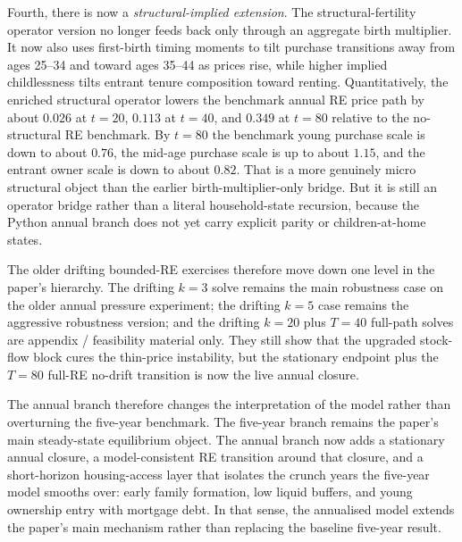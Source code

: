 Fourth, there is now a \emph{structural-implied extension}. The structural-fertility operator
version no longer feeds back only through an aggregate birth multiplier. It now also uses
first-birth timing moments to tilt purchase transitions away from ages 25--34 and toward ages
35--44 as prices rise, while higher implied childlessness tilts entrant tenure composition
toward renting. Quantitatively, the enriched structural operator lowers the benchmark annual RE
price path by about $0.026$ at $t=20$, $0.113$ at $t=40$, and $0.349$ at $t=80$ relative to
the no-structural RE benchmark. By $t=80$ the benchmark young purchase scale is down to about
$0.76$, the mid-age purchase scale is up to about $1.15$, and the entrant owner scale is down
to about $0.82$. That is a more genuinely micro structural object than the earlier
birth-multiplier-only bridge. But it is still an operator bridge rather than a literal
household-state recursion, because the Python annual branch does not yet carry explicit parity
or children-at-home states.

The older drifting bounded-RE exercises therefore move down one level in the paper's
hierarchy. The drifting $k=3$ solve remains the main robustness case on the older annual
pressure experiment; the drifting $k=5$ case remains the aggressive robustness version; and
the drifting $k=20$ plus $T=40$ full-path solves are appendix / feasibility material only.
They still show that the upgraded stock-flow block cures the thin-price instability, but the
stationary endpoint plus the $T=80$ full-RE no-drift transition is now the live annual
closure.

The annual branch therefore changes the interpretation of the model rather than overturning the
five-year benchmark. The five-year branch remains the paper's main steady-state equilibrium
object. The annual branch now adds a stationary annual closure, a model-consistent RE
transition around that closure, and a short-horizon housing-access layer that isolates the
crunch years the five-year model smooths over: early family formation, low liquid buffers,
and young ownership entry with mortgage debt. In that sense, the annualised model extends the
paper's main mechanism rather than replacing the baseline five-year result.
